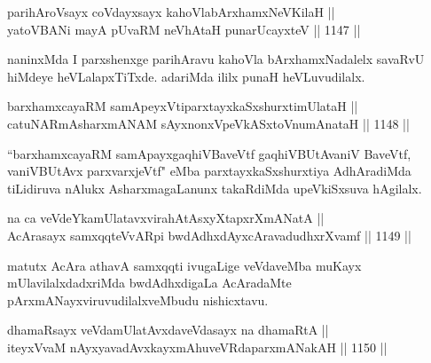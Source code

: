 
\begin{shl}
\footnotemark[1]parihAroV\s sayx coVdayxsayx kahoVlabArxhamxNeV\s KilaH || \\
yatoV\s BANi mayA pUvaRM neVhAtaH punarUcayxteV \hfill || 1147 ||  
\end{shl}

\begin{artha}
naninxMda I parxshenxge parihAravu kahoVla bArxhamxNadalelx savaRvU hiMdeye heVLalapxTiTxde. adariMda ililx punaH heVLuvudilalx.
\end{artha}


\begin{shl}
barxhamxcayaRM samApeyxVtiparxtayxkaSxshurxtimUlataH || \\
catuNARmAsharxmANAM sAyxnonxVpeVkASx\s toV\s numAnataH \hfill || 1148 ||  
\end{shl}

\begin{artha}
``barxhamxcayaRM samApayxgaqhiVBaveVtf gaqhiVBUtAvaniV BaveVtf, vaniVBUtAvx parxvarxjeVtf" eMba parxtayxkaSxshurxtiya AdhAradiMda tiLidiruva nAlukx AsharxmagaLanunx takaRdiMda upeVkiSxsuva hAgilalx.
\end{artha}

\begin{shl}
na ca veVdeYkamUlatavxvirahAtAsxyXtapxrXmANatA || \\
AcArasayx samxqqteVvAR\s pi bwdAdhxdAyxcAravadudhxrXvamf \hfill || 1149 ||  
\end{shl}

\begin{artha}
matutx AcAra athavA samxqqti ivugaLige veVdaveMba muKayx mUlavilalxdadxriMda bwdAdhxdigaLa AcAradaMte pArxmANayxviruvudilalxveMbudu nishicxtavu.
\end{artha}


\begin{shl}
dhamaRsayx veVdamUlatAvxdaveVdasayx na dhamaRtA ||  \\
iteyxVvaM nAyxyavadAvxkayxmAhu\footnotemark[1]veVRdaparxmANakAH \hfill || 1150 ||  
\end{shl}

